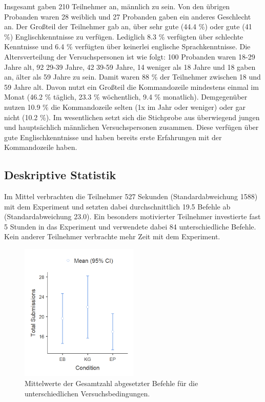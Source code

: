 Insgesamt gaben 210 Teilnehmer an, männlich zu sein. Von den übrigen Probanden waren 28 weiblich und 27 Probanden gaben ein anderes Geschlecht an. Der Großteil der Teilnehmer gab an, über sehr gute (44.4 \%) oder gute (41 \%) Englischkenntnisse zu verfügen. Lediglich 8.3 \% verfügten über schlechte Kenntnisse und 6.4 \% verfügten über keinerlei englische Sprachkenntnisse. Die Altersverteilung der Versuchspersonen ist wie folgt: 100 Probanden waren 18-29 Jahre alt, 92  29-39 Jahre,  42 39-59 Jahre, 14 weniger als 18 Jahre und 18 gaben an, älter als 59 Jahre zu sein. Damit waren 88 \% der Teilnehmer zwischen 18 und 59 Jahre alt. Davon nutzt ein Großteil die Kommandozeile mindestens einmal im Monat (46.2 \% täglich, 23.3 \% wöchentlich, 9.4 \% monatlich). Demgegenüber nutzen 10.9 \% die Kommandozeile selten (1x im Jahr oder weniger) oder gar nicht (10.2 \%). Im wesentlichen setzt sich die Stichprobe aus überwiegend jungen und hauptsächlich männlichen Versuchspersonen zusammen. Diese verfügen über gute Englischkenntnisse und haben bereits erste Erfahrungen mit der Kommandozeile haben.

\subsection{Deskriptive Statistik}
Im Mittel verbrachten die Teilnehmer 527 Sekunden (Standardabweichung 1588) mit dem Experiment und setzten dabei durchschnittlich 19.5 Befehle ab (Standardabweichung 23.0). Ein besonders motivierter Teilnehmer investierte fast 5 Stunden in das Experiment und verwendete dabei 84 unterschiedliche Befehle. Kein anderer Teilnehmer verbrachte mehr Zeit mit dem Experiment.

\begin{figure}[htbp]
    \centering
    \includegraphics[width=0.5\textwidth]{img/auswertung/mean_subs.png}
    \caption{Mittelwerte der Gesamtzahl abgesetzter Befehle für die unterschiedlichen Versuchsbedingungen.}
    \label{mean_subs}
\end{figure}

